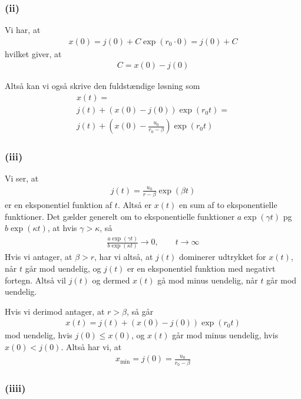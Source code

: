 \documentclass[12pt]{article}
\begin{document}
\subsubsection{(ii)}

Vi har, at
\begin{align}
x(0) = j(0) + C\exp(r_0\cdot 0) = j(0) + C
\end{align}
hvilket giver, at
\begin{align}
C = x(0) - j(0)
\end{align}

Altså kan vi også skrive den fuldstændige løsning som
\begin{align}
x(t) = \\ j(t) + (x(0) - j(0))\exp(r_0t) = \\ j(t) + \left(x(0) - \frac{u_0 }{r_0 - \beta} \right)\exp(r_0t)
\end{align}

\subsubsection{(iii)}

Vi ser, at 
\begin{align}
j(t) = \frac{u_0 }{r - \beta} \exp(\beta t)
\end{align}
er en eksponentiel funktion af $t$. Altså er $x(t)$ en sum af to eksponentielle funktioner. Det gælder generelt om to eksponentielle funktioner $a \exp(\gamma t)$ pg $b \exp(\kappa t)$, at hvis $\gamma > \kappa$, så
\begin{align}
\frac{a \exp(\gamma t)}{b\exp(\kappa t)} \to 0, \qquad t\to \infty
\end{align}
Hvis vi antager, at $\beta > r$, har vi altså, at $j(t)$ dominerer udtrykket for $x(t)$, når $t$ går mod uendelig, og $j(t)$ er en eksponentiel funktion med negativt fortegn. Altså vil $j(t)$ og dermed $x(t)$ gå mod minus uendelig, når $t$ går mod uendelig. 

Hvis vi derimod antager, at $r > \beta$, så går
\begin{align}
x(t) = j(t) + (x(0) - j(0))\exp(r_0t)
\end{align}
mod uendelig, hvis $j(0) \leq x(0)$, og $x(t)$ går mod minus uendelig, hvis $x(0) < j(0)$. Altså har vi, at
\begin{align}
x_{\min} = j(0) = \frac{u_0 }{r_0 - \beta}
\end{align}

\subsubsection{(iiii)}
\end{document}
